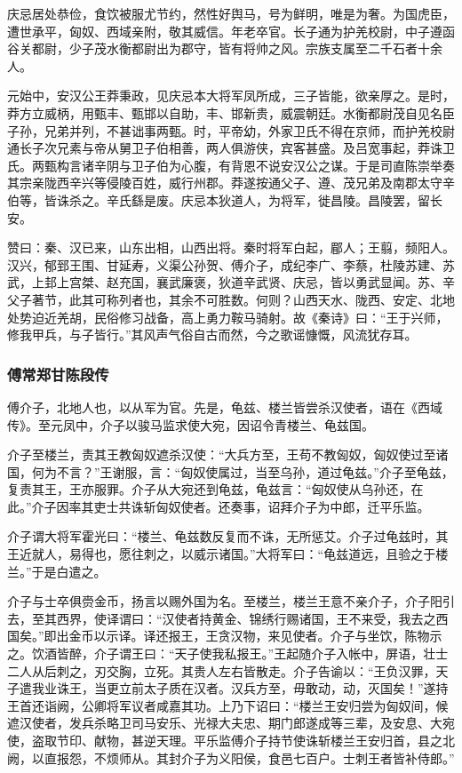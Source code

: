 \documentclass[]{article}
\begin{document}
庆忌居处恭俭，食饮被服尤节约，然性好舆马，号为鲜明，唯是为奢。为国虎臣，遭世承平，匈奴、西域亲附，敬其威信。年老卒官。长子通为护羌校尉，中子遵函谷关都尉，少子茂水衡都尉出为郡守，皆有将帅之风。宗族支属至二千石者十余人。

元始中，安汉公王莽秉政，见庆忌本大将军凤所成，三子皆能，欲亲厚之。是时，莽方立威柄，用甄丰、甄邯以自助，丰、邯新贵，威震朝廷。水衡都尉茂自见名臣子孙，兄弟并列，不甚诎事两甄。时，平帝幼，外家卫氏不得在京师，而护羌校尉通长子次兄素与帝从舅卫子伯相善，两人俱游侠，宾客甚盛。及吕宽事起，莽诛卫氏。两甄构言诸辛阴与卫子伯为心腹，有背恩不说安汉公之谋。于是司直陈崇举奏其宗亲陇西辛兴等侵陵百姓，威行州郡。莽遂按通父子、遵、茂兄弟及南郡太守辛伯等，皆诛杀之。辛氏繇是废。庆忌本狄道人，为将军，徙昌陵。昌陵罢，留长安。

赞曰：秦、汉已来，山东出相，山西出将。秦时将军白起，郿人；王翦，频阳人。汉兴，郁郅王围、甘延寿，义渠公孙贺、傅介子，成纪李广、李蔡，杜陵苏建、苏武，上邽上宫桀、赵充国，襄武廉褒，狄道辛武贤、庆忌，皆以勇武显闻。苏、辛父子著节，此其可称列者也，其余不可胜数。何则？山西天水、陇西、安定、北地处势迫近羌胡，民俗修习战备，高上勇力鞍马骑射。故《秦诗》曰：``王于兴师，修我甲兵，与子皆行。''其风声气俗自古而然，今之歌谣慷慨，风流犹存耳。

\hypertarget{header-n5128}{%
\subsubsection{傅常郑甘陈段传}\label{header-n5128}}

傅介子，北地人也，以从军为官。先是，龟兹、楼兰皆尝杀汉使者，语在《西域传》。至元凤中，介子以骏马监求使大宛，因诏令青楼兰、龟兹国。

介子至楼兰，责其王教匈奴遮杀汉使：``大兵方至，王苟不教匈奴，匈奴使过至诸国，何为不言？''王谢服，言：``匈奴使属过，当至乌孙，道过龟兹。''介子至龟兹，复责其王，王亦服罪。介子从大宛还到龟兹，龟兹言：``匈奴使从乌孙还，在此。''介子因率其吏士共诛斩匈奴使者。还奏事，诏拜介子为中郎，迁平乐监。

介子谓大将军霍光曰：``楼兰、龟兹数反复而不诛，无所惩艾。介子过龟兹时，其王近就人，易得也，愿往刺之，以威示诸国。''大将军曰：``龟兹道远，且验之于楼兰。''于是白遣之。

介子与士卒俱赍金币，扬言以赐外国为名。至楼兰，楼兰王意不亲介子，介子阳引去，至其西界，使译谓曰：``汉使者持黄金、锦绣行赐诸国，王不来受，我去之西国矣。''即出金币以示译。译还报王，王贪汉物，来见使者。介子与坐饮，陈物示之。饮酒皆醉，介子谓王曰：``天子使我私报王。''王起随介子入帐中，屏语，壮士二人从后刺之，刃交胸，立死。其贵人左右皆散走。介子告谕以：``王负汉罪，天子遣我业诛王，当更立前太子质在汉者。汉兵方至，毋敢动，动，灭国矣！''遂持王首还诣阙，公卿将军议者咸嘉其功。上乃下诏曰：``楼兰王安归尝为匈奴间，候遮汉使者，发兵杀略卫司马安乐、光禄大夫忠、期门郎遂成等三辈，及安息、大宛使，盗取节印、献物，甚逆天理。平乐监傅介子持节使诛斩楼兰王安归首，县之北阙，以直报怨，不烦师从。其封介子为义阳侯，食邑七百户。士刺王者皆补侍郎。''
\end{document}
